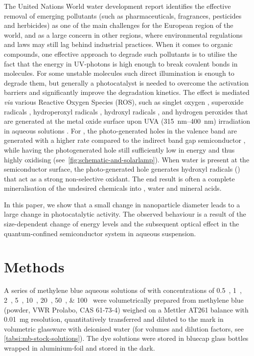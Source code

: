 \documentclass[9pt,twoside,twocolumn]{article}\usepackage{knitr}
\begin{document}
\begin{refsection}
The United Nations World water development report \cite{WWAP2017} identifies the effective removal of emerging pollutants 
(such as pharmaceuticals, fragrances, pesticides and herbicides) 
as one of the main challenges for the European region of the world, and as a large concern in other regions, where environmental regulations and laws may still lag behind industrial practices.
When it comes to organic compounds, one effective approach to degrade such pollutants is to utilise the fact that the energy in UV-photons is high enough to break covalent bonds in molecules. 
For some unstable molecules such direct illumination is enough to degrade them, but generally a photocatalyst is needed to overcome the activation barriers and significantly improve the degradation kinetics. 
The effect is mediated \textit{via} various Reactive Oxygen Species (ROS), such as singlet oxygen , superoxide radicals ,  hydroperoxyl radicals , hydroxyl radicals  , and hydrogen peroxides  that are generated at the metal oxide surface upon UVA (\qtyrange{315}{400}{\nm}) irradiation in aqueous solutions \cite{Tachikawa2007}. 
For , the photo-generated holes in the valence band are generated with a higher rate compared to the indirect band gap semiconductor , while having the photogenerated hole still sufficiently low in energy and thus highly oxidising (see~\cref{fig:schematic-and-solarlamp}).
When water is present at the semiconductor surface, the photo-generated hole generates hydroxyl radicals () \cite{Herrmann2005,Chen2007d} that act as a strong non-selective oxidant. 
The end result is often a complete mineralisation of the undesired chemicals into , water and mineral acids.

In this paper, we show that a small change in  nanoparticle diameter leads to a large change in photocatalytic activity. The observed behaviour is a result of the size-dependent change of energy levels and the subsequent optical effect in the quantum-confined semiconductor system in aqueous suspension.





\section{Methods}

A series of methylene blue aqueous solutions of with concentrations of \qtylist{0.5;1;2;5;10;20;50;100}{\micromolar} were volumetrically prepared from methylene blue (powder, VWR Prolabo, CAS 61-73-4) weighed on a Mettler AT261 balance with \qty{0.01}{\mg} resolution, quantitatively transferred and diluted to the mark in volumetric glassware with deionised water (for volumes and dilution factors, see \cref{tabsi:mb-stock-solutions}). 
The dye solutions were stored in bluecap glass bottles wrapped in aluminium-foil and stored in the dark.


\end{refsection}
\end{document}
